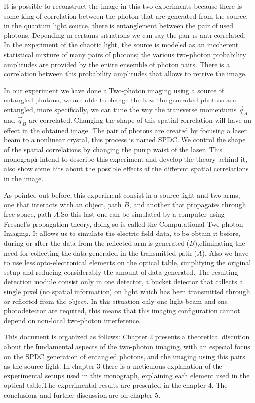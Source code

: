 It is possible to reconstruct the image in this two experiments because there is some king of 
correlation between the photon that are generated from the source, in the quantum light source, there
is entanglement between the pair of used photons. Depending in certains situations we can say the 
pair is anti-correlated\cite{broke}. In the experiment of the chaotic light, the source is 
modeled as an incoherent statistical mixture of many pairs of photons; the various two-photon 
probability amplitudes are provided by the entire ensemble of photon pairs. There is a correlation
between this probability amplitudes that allows to retrive the image.

In our experiment we have done a Two-photon imaging using a source of entangled photons, we are able
to change the how the generated photons are entangled, more specifically, we can tune 
the way the transverse momentums $\vec{q}_A$ and $\vec{q}_B$ are correlated. Changing the shape of this
spatial correlation will have an effect in the obtained image. The pair of photons are created by 
focusing a laser beam to a nonlinear crystal, this process is named SPDC. We control the shape
of the spatial correlations by changing the pump waist of the laser. This monograph intend to describe
this experiment and develop the theory behind it, also show some hits about the possible 
effects of the different spatial correlations in the image.

As pointed out before, this experiment consist in a source light and two arms, one that interacts 
with an object, path $B$, and another that propagates through free space, path $A$.So this last one 
can be simulated by a computer using Fresnel's propagation theory, doing so is called the Computational 
Two-photon Imaging. It allows us to simulate the electric field data, to be obtain it before, during 
or after the data from the reflected arm is generated ($B$),eliminating the need for collecting 
the data generated in the transmitted path ($A$). Also we have to use less opto-electronical 
elements on the optical table, simplifying the original setup and reducing considerably 
the amount of data generated. The resulting detection module consist only in one detector, a bucket detector that collects
 a single pixel (no spatial information) on light which has been transmitted through or reflected from the object.
In this situation only one light beam and one photodetector are required, this means that this imaging configuration cannot depend
on non-local two-photon interference\cite{simulated}.



This document is organized as follows: Chapter 2 presents a theoretical discution about the fundamental 
aspects of the two-photon imaging, with an especial focus on the SPDC generation of entangled photons, and
the imaging using this pairs as the source light. 
In chapter 3 there is a meticulous explanation of the experimental setups used in this monograph,
explaining each element used in the optical table.The experimental results are presented in the 
chapter 4. The conclusions and further discussion are on chapter 5.

